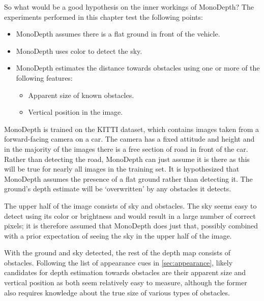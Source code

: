 So what would be a good hypothesis on the inner workings of MonoDepth?
The experiments performed in this chapter test the following points:
\begin{itemize}
\item MonoDepth assumes there is a flat ground in front of the vehicle.
\item MonoDepth uses color to detect the sky.
\item MonoDepth estimates the distance towards obstacles using one or more of the following features:
\begin{itemize}
\item Apparent size of known obstacles.
\item Vertical position in the image.
\end{itemize}
\end{itemize}
MonoDepth is trained on the KITTI dataset, which contains images taken from a forward-facing camera on a car.
The camera has a fixed attitude and height and in the majority of the images there is a free section of road in front of the car.
Rather than detecting the road, MonoDepth can just assume it is there as this will be true for nearly all images in the training set.
It is hypothesized that MonoDepth assumes the presence of a flat ground rather than detecting it.
The ground's depth estimate will be `overwritten' by any obstacles it detects.

The upper half of the image consists of sky and obstacles.
The sky seems easy to detect using its color or brightness and would result in a large number of correct pixels; it is therefore assumed that MonoDepth does just that, possibly combined with a prior expectation of seeing the sky in the upper half of the image.

With the ground and sky detected, the rest of the depth map consists of obstacles.
Following the list of appearance cues in \autoref{sec:appearance}, likely candidates for depth estimation towards obstacles are their apparent size and vertical position as both seem relatively easy to measure, although the former also requires knowledge about the true size of various types of obstacles.

\medskip

